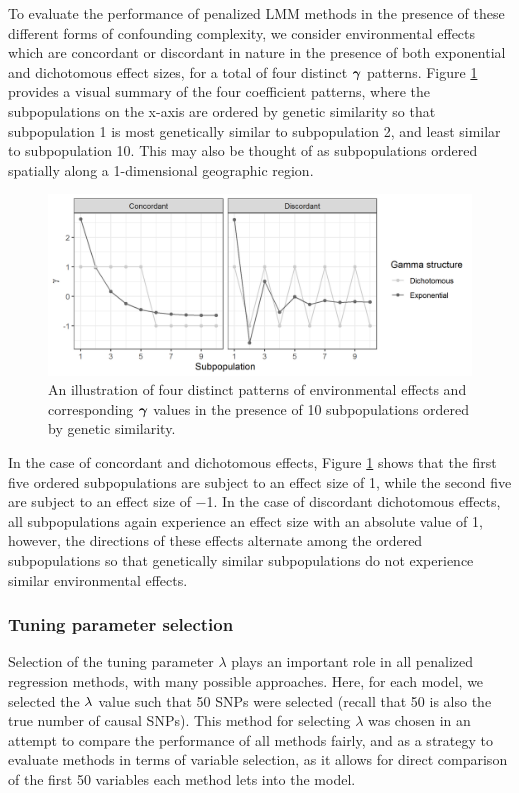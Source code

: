  To evaluate the performance of penalized LMM methods in the presence of these different forms of confounding complexity, we consider environmental effects which are concordant or discordant in nature in the presence of both exponential and dichotomous effect sizes, for a total of four distinct $\boldsymbol{\gamma}$ patterns. Figure \ref{fig:gamma_structures} provides a visual summary of the four coefficient patterns, where the subpopulations on the x-axis are ordered by genetic similarity so that subpopulation 1 is most genetically similar to subpopulation 2, and least similar to subpopulation 10. This may also be thought of as subpopulations ordered spatially along a 1-dimensional geographic region.
\begin{figure}[H]
    \centering
    \includegraphics[scale = 0.9]{figures/gamma_structure.png}
    \caption{An illustration of four distinct patterns of environmental effects and corresponding $\boldsymbol{\gamma}$ values in the presence of 10 subpopulations ordered by genetic similarity.}
    \label{fig:gamma_structures}
\end{figure}
\noindent In the case of concordant and dichotomous effects, Figure \ref{fig:gamma_structures} shows that the first five ordered subpopulations are subject to an effect size of 1, while the second five are subject to an effect size of $-$1. In the case of discordant dichotomous effects, all subpopulations again experience an effect size with an absolute value of 1, however, the directions of these effects alternate among the ordered subpopulations so that genetically similar subpopulations do not experience similar environmental effects. 

\subsubsection{Tuning parameter selection}
Selection of the tuning parameter $\lambda$ plays an important role in all penalized regression methods, with many possible approaches. Here, for each model, we selected the $\lambda$ value such that 50 SNPs were selected (recall that 50 is also the true number of causal SNPs). This method for selecting $\lambda$ was chosen in an attempt to compare the performance of all methods fairly, and as a strategy to evaluate methods in terms of variable selection, as it allows for direct comparison of the first 50 variables each method lets into the model.

